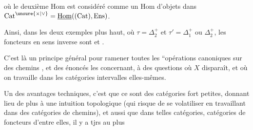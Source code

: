 
où le deuxième $\mathrm{Hom}$ est considéré comme un $\mathrm{Hom}$ d'objets dans $\mathrm{Cat}^{\unsure{\times|\vee}}=\underline{\mathrm{Hom}}((\mathrm{Cat}),\mathrm{Ens})$.

Ainsi, dans les deux exemples plus haut, où $\tau=\mathbb{\Delta}_2^+$ et $\tau'=\mathbb{\Delta}_1^+$ ou $\mathbb{\Delta}_2^+$, les foncteurs en sens inverse sont
et
.

C'est là un principe général pour ramener toutes les ``opérations \inserted{$\pm$} canoniques sur des chemins , et des énoncés les concernant, à des questions où $X$ disparaît, et où on travaille dans les catégories intervalles elles-mêmes.

Un des avantages techniques, c'est que ce sont des catégories fort petites, donnant lieu de plus à une intuition topologique  (qui risque de se volatiliser  en travaillant  dans des catégories de chemins), et aussi que dans  telles catégories,   catégories de foncteurs d'entre elles, il y a tjrs au plus
